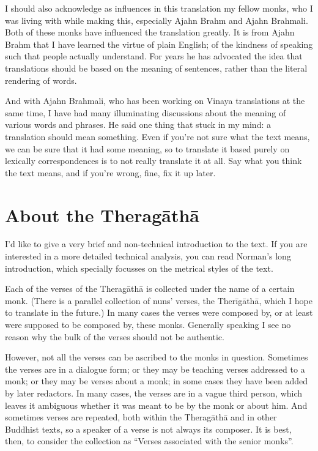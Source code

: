 \documentclass[10pt, openany]{book}
\begin{document}
I should also acknowledge as influences in this translation my fellow monks, who I was living with while making this, especially Ajahn Brahm and Ajahn Brahmali. Both of these monks have influenced the translation greatly. It is from Ajahn Brahm that I have learned the virtue of plain English; of the kindness of speaking such that people actually understand. For years he has advocated the idea that translations should be based on the meaning of sentences, rather than the literal rendering of words. 

And with Ajahn Brahmali, who has been working on Vinaya translations at the same time, I have had many illuminating discussions about the meaning of various words and phrases. He said one thing that stuck in my mind: a translation should mean something. Even if you’re not sure what the text means, we can be sure that it had some meaning, so to translate it based purely on lexically correspondences is to not really translate it at all. Say what you think the text means, and if you’re wrong, fine, fix it up later.

\section*{About the Theragāthā}

I’d like to give a very brief and non-technical introduction to the text. If you are interested in a more detailed technical analysis, you can read Norman’s long introduction, which specially focusses on the metrical styles of the text.

Each of the verses of the Thera\-gāthā is collected under the name of a certain monk. (There is a parallel collection of nuns’ verses, the Therīgāthā, which I hope to translate in the future.) In many cases the verses were composed by, or at least were supposed to be composed by, these monks. Generally speaking I see no reason why the bulk of the verses should not be authentic. 

However, not all the verses can be ascribed to the monks in question. Sometimes the verses are in a dialogue form; or they may be teaching verses addressed to a monk; or they may be verses about a monk; in some cases they have been added by later redactors. In many cases, the verses are in a vague third person, which leaves it ambiguous whether it was meant to be by the monk or about him. And sometimes verses are repeated, both within the Thera\-gāthā and in other Buddhist texts, so a speaker of a verse is not always its composer. It is best, then, to consider the collection as “Verses associated with the senior monks”.
\end{document}
